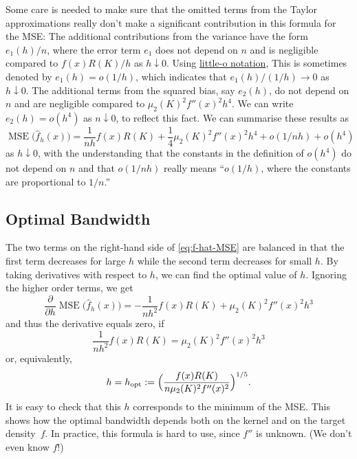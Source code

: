 \documentclass[
  a4paper,
]{article}
\theoremstyle{definition}
\theoremstyle{definition}
\theoremstyle{definition}
\theoremstyle{definition}
\theoremstyle{remark}
\begin{document}
Some care is needed to make sure that the omitted terms from the Taylor
approximations really don't make a significant contribution in this formula for
the MSE: The additional contributions from the variance have the form \(e_1(h) / n\), where the error term \(e_1\) does not depend on \(n\) and is negligible
compared to \(f(x) R(K) / h\) as \(h \downarrow 0\). Using
\href{https://en.wikipedia.org/wiki/Big_O_notation\#Little-o_notation}{little-o notation},
This is sometimes denoted by \(e_1(h) = o(1/h)\), which indicates that \(e_1(h) / (1/h) \to 0\) as \(h \downarrow 0\). The additional terms from the squared bias, say
\(e_2(h)\), do not depend on \(n\) and are negligible compared to \(\mu_2(K)^2 f''(x)^2 h^4\). We can write \(e_2(h) = o(h^4)\) as \(n \downarrow 0\), to reflect
this fact. We can summarise these results as
\begin{equation*}
  \mathop{\mathrm{MSE}}\nolimits\bigl( \hat f_h(x) \bigr)
  = \frac{1}{nh} f(x) R(K)
      + \frac14 \mu_2(K)^2 f''(x)^2 h^4
      + o(1/nh) + o(h^4)
\end{equation*}
as \(h \downarrow 0\),
with the understanding that the constants in the definition of \(o(h^4)\)
do not depend on \(n\) and that \(o(1/nh)\) really means ``\(o(1/h)\), where the
constants are proportional to \(1/n\).''

\hypertarget{optimal-bandwidth}{%
\subsection{Optimal Bandwidth}\label{optimal-bandwidth}}

The two terms on the right-hand side of \eqref{eq:f-hat-MSE} are balanced in
that the first term decreases for large \(h\) while the second term decreases for
small \(h\). By taking derivatives with respect to \(h\), we can
find the optimal value of \(h\). Ignoring the higher order terms, we get
\begin{equation*}
  \frac{\partial}{\partial h} \mathop{\mathrm{MSE}}\nolimits\bigl( \hat f_h(x) \bigr)
  = -\frac{1}{nh^2} f(x) R(K) + \mu_2(K)^2 f''(x)^2 h^3
\end{equation*}
and thus the derivative equals zero, if
\begin{equation*}
  \frac{1}{nh^2} f(x) R(K) = \mu_2(K)^2 f''(x)^2 h^3
\end{equation*}
or, equivalently,
\begin{equation*}
  h
  = h_\mathrm{opt}
  := \Bigl( \frac{f(x) R(K)}{n \mu_2(K)^2 f''(x)^2} \Bigr)^{1/5}.
\end{equation*}
It is easy to check that this \(h\) corresponds to the minimum of the MSE.
This shows how the optimal bandwidth depends both on the kernel and on
the target density~\(f\). In practice, this formula is hard to use,
since \(f''\) is unknown. (We don't even know \(f\)!)
\end{document}
